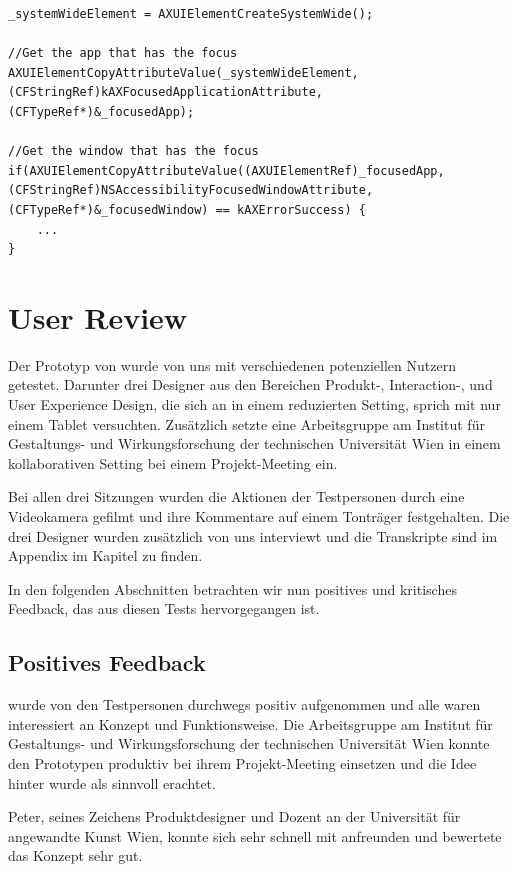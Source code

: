 \begin{lstlisting}[float,caption=Laden von Accessibility Daten]
_systemWideElement = AXUIElementCreateSystemWide();
	
//Get the app that has the focus
AXUIElementCopyAttributeValue(_systemWideElement, (CFStringRef)kAXFocusedApplicationAttribute, (CFTypeRef*)&_focusedApp);

//Get the window that has the focus
if(AXUIElementCopyAttributeValue((AXUIElementRef)_focusedApp, (CFStringRef)NSAccessibilityFocusedWindowAttribute, (CFTypeRef*)&_focusedWindow) == kAXErrorSuccess) {
    ...
}		
\end{lstlisting}

\section{User Review} \label{sec:userReview}
Der Prototyp von \scribbler wurde von uns mit verschiedenen potenziellen Nutzern getestet. Darunter drei Designer aus den Bereichen Produkt-, Interaction-, und User Experience Design, die sich an \scribbler in einem reduzierten Setting, sprich mit nur einem Tablet versuchten. Zusätzlich setzte eine Arbeitsgruppe am Institut für Gestaltungs- und Wirkungsforschung der technischen Universität Wien \scribbler in einem kollaborativen Setting bei einem Projekt-Meeting ein. 

Bei allen drei Sitzungen wurden die Aktionen der Testpersonen durch eine Videokamera gefilmt und ihre Kommentare auf einem Tonträger festgehalten. Die drei Designer wurden zusätzlich von uns interviewt und die Transkripte sind im Appendix im Kapitel  zu finden.

In den folgenden Abschnitten betrachten wir nun positives und kritisches Feedback, das aus diesen Tests hervorgegangen ist.

\subsection{Positives Feedback}

\scribbler wurde von den Testpersonen durchwegs positiv aufgenommen und alle waren interessiert an Konzept und Funktionsweise. Die Arbeitsgruppe am Institut für Gestaltungs- und Wirkungsforschung der technischen Universität Wien konnte den Prototypen produktiv bei ihrem Projekt-Meeting einsetzen und die Idee hinter \scribbler wurde als sinnvoll erachtet. 

Peter, seines Zeichens Produktdesigner und Dozent an der Universität für angewandte Kunst Wien, konnte sich sehr schnell mit \scribbler anfreunden und bewertete das Konzept sehr gut.

